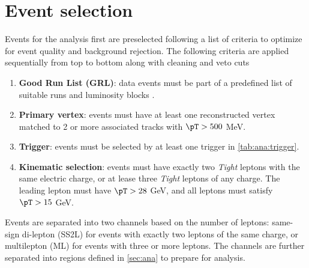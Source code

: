 \documentclass[../thesis.tex]{subfiles}
\begin{document}
\vspace{-1\baselineskip}

\section{Event selection}
Events for the analysis first are preselected following a list of criteria to optimize for event quality and background rejection. The following criteria are applied sequentially from top to bottom along with cleaning and veto cuts

\begin{enumerate}
\item \textbf{Good Run List (\acs{GRL})}: data events must be part of a predefined list of suitable runs and luminosity blocks \citep{sample:data}.
\item \textbf{Primary vertex}: events must have at least one reconstructed vertex matched to 2 or more associated tracks with $\pT>500$ MeV.
\item \textbf{Trigger}: events must be selected by at least one trigger in \autoref{tab:ana:trigger}.
\item \textbf{Kinematic selection}: events must have exactly two \textit{Tight} leptons with the same electric charge, or at lease three \textit{Tight} leptons of any charge. The leading lepton must have $\pT>28$ GeV, and all leptons must satisfy $\pT>15$ GeV.
\end{enumerate}

Events are separated into two channels based on the number of leptons: same-sign di-lepton (\acs{SS2L}) for events with exactly two leptons of the same charge, or multilepton (\acs{ML}) for events with three or more leptons. The channels are further separated into regions defined in \autoref{sec:ana} to prepare for analysis.
\end{document}
